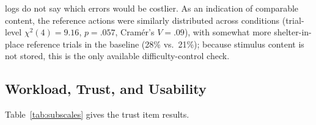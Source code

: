 \documentclass[journal]{IEEEtran}
\theoremstyle{plain}
\theoremstyle{definition}
\providecommand{\DIFaddtex}[1]{{\protect\color{blue} \sf #1}} %
\providecommand{\DIFaddbegin}{} %
\providecommand{\DIFaddend}{} %
\providecommand{\DIFdelbegin}{} %
\providecommand{\DIFdelend}{} %
\providecommand{\DIFadd}[1]{\texorpdfstring{\DIFaddtex{#1}}{#1}} %
\newcommand{\DIFscaledelfig}{0.5}
\newlength{\DIFdelgraphicswidth} %
\newlength{\DIFdelgraphicsheight} %
\newcommand{\DIFaddincludegraphics}[2][]{{\color{blue}\fbox{\DIFOincludegraphics[#1]{#2}}}} %
\newcommand{\DIFdelincludegraphics}[2][]{%
\sbox{\DIFdelgraphicsbox}{\DIFOincludegraphics[#1]{#2}}%
\settoboxwidth{\DIFdelgraphicswidth}{\DIFdelgraphicsbox} %
\settoboxtotalheight{\DIFdelgraphicsheight}{\DIFdelgraphicsbox} %
\scalebox{\DIFscaledelfig}{%
\parbox[b]{\DIFdelgraphicswidth}{\usebox{\DIFdelgraphicsbox}\\[-\baselineskip] \rule{\DIFdelgraphicswidth}{0em}}\llap{\resizebox{\DIFdelgraphicswidth}{\DIFdelgraphicsheight}{%
\setlength{\unitlength}{\DIFdelgraphicswidth}%
\begin{picture}(1,1)%
\thicklines\linethickness{2pt} %
{\color[rgb]{1,0,0}\put(0,0){\framebox(1,1){}}}%
{\color[rgb]{1,0,0}\put(0,0){\line( 1,1){1}}}%
{\color[rgb]{1,0,0}\put(0,1){\line(1,-1){1}}}%
\end{picture}%
}\hspace*{3pt}}} %
} %
\DeclareRobustCommand{\DIFaddbegin}{\DIFOaddbegin \let\includegraphics\DIFaddincludegraphics} %
\DeclareRobustCommand{\DIFaddend}{\DIFOaddend \let\includegraphics\DIFOincludegraphics} %
\DeclareRobustCommand{\DIFdelbegin}{\DIFOdelbegin \let\includegraphics\DIFdelincludegraphics} %
\DeclareRobustCommand{\DIFdelend}{\DIFOaddend \let\includegraphics\DIFOincludegraphics} %
\begin{document}
\DIFdelend \DIFaddbegin \DIFadd{logs do not say which errors would be costlier. As an indication of comparable content, the reference actions were similarly distributed across conditions (trial-level $\chi^2(4)=9.16$, $p=.057$, Cram\'er's $V=.09$), with somewhat more shelter-in-place reference trials in the baseline (28\% vs.\ 21\%); because stimulus content is not stored, this is the only available difficulty-control check.
}\DIFaddend 

    \DIFdelbegin %
\DIFdelend \DIFaddbegin \subsection{\DIFadd{Workload, Trust, and Usability}}
    \label{sec:res_sub}
    \DIFadd{Table~\ref{tab:subscales} gives the trust item results.
}\DIFaddend 
\end{document}
